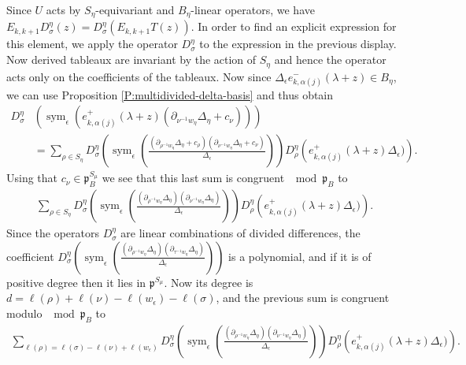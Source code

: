 \documentclass[11pt,fleqn]{article}
\newcommand\p{\mathfrak p}
\DeclareMathOperator\sym{sym}
\begin{document}
Since $U$ acts by $S_\eta$-equivariant and $B_\eta$-linear operators, we have
$E_{k,k+1} D_\sigma^\eta(z) = D_\sigma^\eta(E_{k,k+1} T(z))$. In order to find
an explicit expression for this element, we apply the operator $D_\sigma^\eta$
to the expression in the previous display. Now derived tableaux are invariant
by the action of $S_\eta$ and hence the operator acts only on the coefficients
of the tableaux. Now since $\Delta_\epsilon e_{k,\alpha(j)}^-(\lambda + z) 
\in B_\eta$, we can use Proposition \ref{P:multidivided-delta-basis} and
thus obtain
\begin{align*}
D_{\sigma}^\eta &\left(
  \sym_\epsilon\left( 
    e_{k,\alpha(j)}^+(\lambda + z) 
      (\partial_{\nu^{-1}w_\eta}\Delta_\eta + c_\nu) 
    \right)
  \right) \\
  &=\sum_{\rho \in S_\eta}D_{\sigma}^\eta \left(
    \sym_\epsilon\left( 
      \frac{
        (\partial_{\rho^{-1}w_\eta}\Delta_\eta + c_\rho)
        (\partial_{\nu^{-1}w_\eta}\Delta_\eta + c_\nu)
      }{\Delta_\epsilon} \right) 
    \right) 
    D^\eta_\rho \left(
      e_{k,\alpha(j)}^+(\lambda + z) \Delta_\epsilon)
    \right).
\end{align*}
Using that $c_\nu \in \p_B^{S_\mu}$ we see that this last sum is congruent 
$\mod \p_B$ to
\begin{align*}
\sum_{\rho \in S_\eta}D_{\sigma}^\eta \left(
    \sym_\epsilon\left( 
      \frac{
        (\partial_{\rho^{-1}w_\eta}\Delta_\eta)
        (\partial_{\nu^{-1}w_\eta}\Delta_\eta)
      }{\Delta_\epsilon} \right) 
    \right) 
    D^\eta_\rho \left(
      e_{k,\alpha(j)}^+(\lambda + z) \Delta_\epsilon)
    \right).
\end{align*}
Since the operators $D^\eta_{\sigma}$ are linear combinations of divided
differences, the coefficient $D_{\sigma}^\eta \left(
    \sym_\epsilon\left( 
      \frac{
        (\partial_{\rho^{-1}w_\eta}\Delta_\eta)
        (\partial_{\tau^{-1}w_\eta}\Delta_\eta)
      }{\Delta_\epsilon} \right) 
    \right) $
is a polynomial, and if it is of positive degree then it lies in 
$\p^{S_\mu}$. Now its degree is $d = \ell(\rho) + \ell(\nu) - \ell(w_\epsilon)
- \ell(\sigma)$, and the previous sum is congruent modulo $\mod \p_B$ to
\begin{align*}
\sum_{\ell(\rho) = \ell(\sigma) - \ell(\nu) + \ell(w_\epsilon)}
  D_{\sigma}^\eta \left(
    \sym_\epsilon\left( 
      \frac{
        (\partial_{\rho^{-1}w_\eta}\Delta_\eta)
        (\partial_{\nu^{-1}w_\eta}\Delta_\eta)
      }{\Delta_\epsilon} \right) 
    \right) 
    D^\eta_\rho \left(
      e_{k,\alpha(j)}^+(\lambda + z) \Delta_\epsilon)
    \right).
\end{align*}
\end{document}
